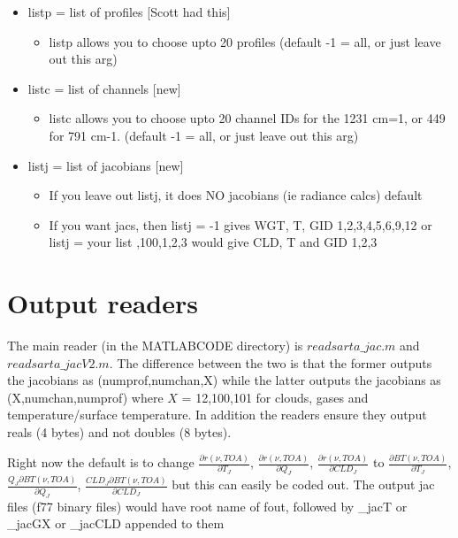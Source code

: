 \documentclass[11pt]{article}
\begin{document}
\begin{itemize}
\item   listp = list of profiles [Scott had this]
  \begin{itemize}
  \item listp allows you to choose upto 20 profiles (default -1 = all, or just
  leave out this arg)
  \end{itemize}  
\item   listc = list of channels [new]
  \begin{itemize}
  \item listc allows you to choose upto 20 channel IDs  for the 1231
  cm=1, or 449 for 791 cm-1. (default -1 = all, or just leave out this arg)
  \end{itemize}
\item   listj = list of jacobians [new]
  \begin{itemize}
  \item If you leave out listj, it does NO jacobians (ie radiance calcs) default

  \item If you want jacs, then listj = -1 gives WGT, T, GID 1,2,3,4,5,6,9,12
                                or listj = your list ,100,1,2,3    would give CLD, T and GID 1,2,3
  \end{itemize}
\end{itemize}

\section{Output readers}

The main reader (in the MATLABCODE directory) is $readsarta\_jac.m$
and $readsarta\_jacV2.m$.  The difference between the two is that the
former outputs the jacobians as (numprof,numchan,X) while the latter
outputs the jacobians as (X,numchan,numprof) where $X$ = 12,100,101
for clouds, gases and temperature/surface temperature. In addition the
readers ensure they output reals (4 bytes) and not doubles (8 bytes).

Right now the default is to change $\frac{\partial
  r(\nu,TOA)}{\partial T_J}$, $\frac{\partial r(\nu,TOA)}{\partial
  Q_J}$, $\frac{\partial r(\nu,TOA)}{\partial CLD_J}$ to
$\frac{\partial BT(\nu,TOA)}{\partial T_J}$, $\frac{Q_J \partial
  BT(\nu,TOA)}{\partial Q_J}$, $\frac{CLD_J \partial
  BT(\nu,TOA)}{\partial CLD_J}$ but this can easily be coded out. The
output jac files (f77 binary files) would have root name of fout,
followed by \_jacT or \_jacGX or \_jacCLD appended to them
\end{document}
